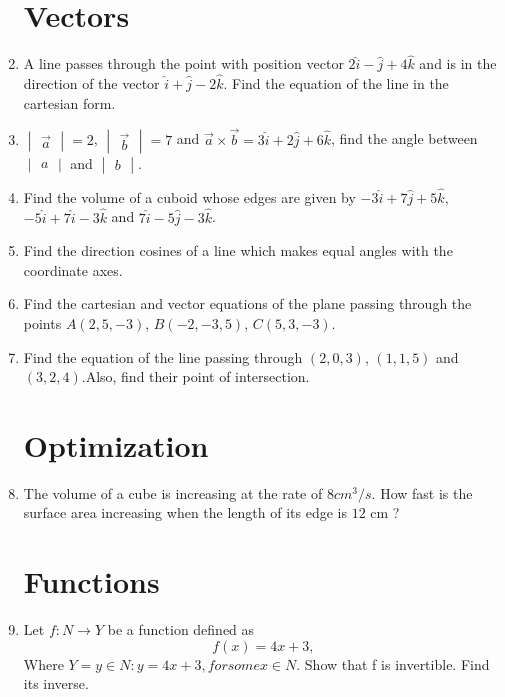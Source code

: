 \documentclass[2pt,-letter paper]{article}
\providecommand{\brak}[1]{\ensuremath{\left(#1\right)}}
\newcommand{\mydet}[1]{\ensuremath{\begin{vmatrix}#1\end{vmatrix}}}
\begin{document}
\begin{enumerate}
\section{Vectors}
\item A line passes through the point with position vector $2\hat{i} - \hat{j} + 4\hat{k}$ and is in the direction of the vector $\hat{i} + \hat{j} -2\hat{k}.$ Find the equation of the line in the cartesian form.
\item $\mydet{\overrightarrow{a}}= 2$, $\mydet{\overrightarrow{b}} = 7$ and  $\overrightarrow{a} \times \overrightarrow{b} = 3\hat{i} + 2\hat{j} + 6\hat{k}$, find the angle between $\mydet{a}$ and $\mydet{b}$.
\item Find the volume of a cuboid whose edges are given by $-3\hat{i} + 7\hat{j} + 5\hat{k}$, $-5\hat{i} + 7\hat{i} - 3\hat{k}$ and $7\hat{i} -5\hat{j} -3\hat{k}$.
\item Find the direction cosines of a line which makes equal angles with the coordinate axes.
\item Find the cartesian and vector equations of the plane passing through the points $A\brak{2,5,-3}$, $B\brak{-2,-3,5}$, $C\brak{5,3,-3}$.
\item Find the equation of the line passing through $\brak{2, 0, 3}$, $\brak{1, 1, 5}$ and $\brak{3, 2, 4}$.Also, find their point of intersection.
\section{Optimization}
\item The volume of a cube is increasing at the rate of $8 cm^3/s$. How fast is the surface area increasing when the length of its edge is $12$ cm ?
\section{Functions}
\item Let $f : N \rightarrow Y$ be a function defined as 
\begin{equation}
 f(x) = 4x + 3,
\end{equation}
Where $Y = {y \in N : y = 4x + 3, for some x \in N}$. Show that f is invertible. Find its inverse.

\end{enumerate}
\end{document}
